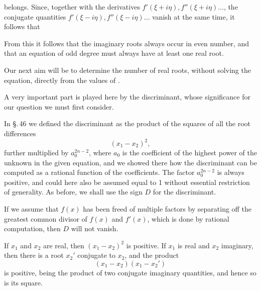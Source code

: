 belongs. Since, together with the derivatives $f'(\xi+i\eta), f''(\xi+i\eta)\ldots$, the conjugate quantities $f'(\xi-i\eta), f''(\xi-i\eta)\ldots$ vanish at the same time, it follows that 

From this it follows that the imaginary roots always occur in even number, and that an equation of odd degree must always have at least one real root.

Our next aim will be to determine the number of real roots, without solving the equation, directly from the values of .

A very important part is played here by the discriminant, whose significance for our question we must first consider.

In \S.\,46 we defined the discriminant as the product of the squares of all the root differences
\[
(x_1 - x_2)^2,
\]
further multiplied by $a_0^{2n-2}$, where $a_0$ is the coefficient of the highest power of the unknown in the given equation, and we showed there how the discriminant can be computed as a rational function of the coefficients. The factor $a_0^{2n-2}$ is always positive, and could here also be assumed equal to 1 without essential restriction of generality. As before, we shall use the sign $D$ for the discriminant.


If we assume that $f(x)$ has been freed of multiple factors by separating off the greatest common divisor of $f(x)$ and $f'(x)$, which is done by rational computation, then $D$ will not vanish.

If $x_1$ and $x_2$ are real, then $(x_1 - x_2)^2$ is positive. If $x_1$ is real and $x_2$ imaginary, then there is a root $x_2'$ conjugate to $x_2$, and the product
\[
(x_1 - x_2)(x_1 - x_2')
\]
is positive, being the product of two conjugate imaginary quantities, and hence so is its square.
